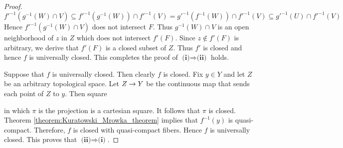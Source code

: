 \begin{proof}
	$$f'^{-1}\left(g^{-1}(W)\cap V\right) \subseteq f'^{-1}\left(g^{-1}(W)\right)\cap f'^{-1}(V) = g'^{-1}\left(f^{-1}(W)\right) \cap f'^{-1}(V) \subseteq g'^{-1}(U)\cap f'^{-1}(V)$$
	Hence $f'^{-1}\left(g^{-1}(W)\cap V\right)$ does not intersect $F$. Thus $g^{-1}(W)\cap V$ is an open neighborhood of $z$ in $Z$ which does not intersect $f'(F)$. Since $z \not \in f'(F)$ is arbitrary, we derive that $f'(F)$ is a closed subset of $Z$. Thus $f'$ is closed and hence $f$ is universally closed. This completes the proof of $\textbf{(i)}\Rightarrow \textbf{(ii)}$ holds.

	Suppose that $f$ is universally closed. Then clearly $f$ is closed. Fix $y \in Y$ and let $Z$ be an arbitrary topological space. Let $Z \rightarrow Y$ be the continuous map that sends each point of $Z$ to $y$. Then square
	\begin{center}
	\end{center}
	in which $\pi$ is the projection is a cartesian square. It follows that $\pi$ is closed. Theorem \ref{theorem:Kuratowski_Mrowka_theorem} implies that $f^{-1}(y)$ is quasi-compact. Therefore, $f$ is closed with quasi-compact fibers. Hence $f$ is universally closed. This proves that $\textbf{(ii)}\Rightarrow \textbf{(i)}$.
\end{proof}


